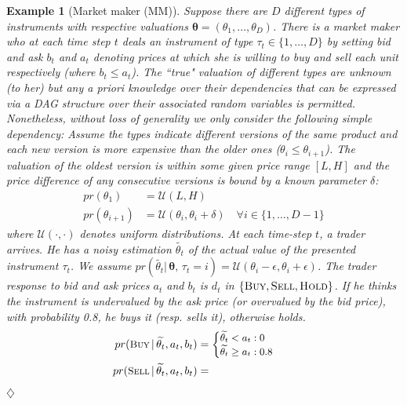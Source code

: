 \documentclass[letterpaper]{article}
\newtheorem{example}{Example}
\def\fexample#1#2#3{\vspace{0ex}\begin{example}[#2]\label{#1}\rm #3
\hspace*{\fill} $\diamondsuit$ \end{example}\vspace{0ex} }
\begin{document}
\fexample{example:market}{Market maker (MM)}{
Suppose there are $D$ different types of \emph{instruments} with 
respective valuations 
$\boldsymbol\theta=(\theta_{1}, \ldots,  \theta_{D})$.
There is a \emph{market maker} 
who at each time step $t$ deals an instrument of type $\tau_t \in \{1, 
\ldots, D\}$ by setting \emph{bid} and \emph{ask} $b_{t}$ and $a_{t}$ denoting 
prices at which she is willing to buy and sell each unit respectively 
(where $b_{t} \leq a_{t}$).
The ``true" valuation of different types
are unknown (to her) but any a priori knowledge over their dependencies that can be expressed via a DAG structure over their associated random variables is permitted.
Nonetheless, without loss of generality we only consider the following simple dependency:  
Assume the types indicate different versions of the same product and
each new version is more expensive than the older ones 
($\theta_{i} \leq \theta_{i+1}$).
The valuation of the oldest version is within some given price range $[L, H]$
and the price difference of any consecutive versions is bound by a known parameter $\delta$:
%
\begin{align*}
pr(\theta_{1})     &= \mathcal{U}(L, H) \qquad \qquad\\
pr(\theta_{i+1})  &= \mathcal{U}(\theta_{i}, \theta_{i} + \delta) \quad \forall i \in \{1, \ldots, D-1\}
\end{align*} 
%
where $\mathcal{U}(\cdot, \cdot)$ denotes uniform distributions. 
At each time-step $t$, a trader arrives. 
He has a noisy estimation $\widetilde{\theta_{t}}$ of the actual 
value of the presented instrument $\tau_t$. 
We assume 
$pr(\widetilde{\theta_{t}} | \, \boldsymbol\theta, \, \tau_t = i) = 
\mathcal{U}(\theta_{i} - \epsilon, \theta_{i} + \epsilon)$.
The trader response to bid and ask prices 
$a_{t}$ and $b_{t}$ is $d_t$ in {\footnotesize $\{\textsc{Buy}, \textsc{Sell}, \textsc{Hold}\}$}. 
If he thinks the instrument is undervalued by the ask price (or overvalued by the bid price), with probability 0.8, he buys it (resp. sells it), otherwise holds. 
\begin{align*}
{\footnotesize pr (\textsc{Buy} \, | \, \widetilde{\theta_{t}}, a_{t}, b_{t})} &=
{\footnotesize
\begin{cases}
\widetilde{\theta_{t}}  <     a_{t} 		: 0\\
\widetilde{\theta_{t}}  \geq a_{t}  		: 0.8
\end{cases}
}
&\\
{\footnotesize pr (\textsc{Sell} \, | \, \widetilde{\theta_{t}} , a_{t}, b_{t})} &= 

\end{align*}}
\end{document}
